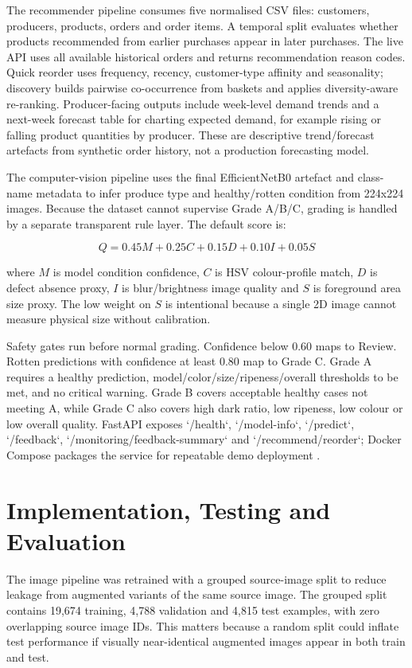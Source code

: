 \documentclass[11pt,a4paper]{article}
\begin{document}
The recommender pipeline consumes five normalised CSV files: customers, producers, products, orders and order items. A temporal split evaluates whether products recommended from earlier purchases appear in later purchases. The live API uses all available historical orders and returns recommendation reason codes. Quick reorder uses frequency, recency, customer-type affinity and seasonality; discovery builds pairwise co-occurrence from baskets and applies diversity-aware re-ranking. Producer-facing outputs include week-level demand trends and a next-week forecast table for charting expected demand, for example rising or falling product quantities by producer. These are descriptive trend/forecast artefacts from synthetic order history, not a production forecasting model.

The computer-vision pipeline uses the final EfficientNetB0 artefact and class-name metadata to infer produce type and healthy/rotten condition from 224x224 images. Because the dataset cannot supervise Grade A/B/C, grading is handled by a separate transparent rule layer. The default score is:

\[
Q = 0.45M + 0.25C + 0.15D + 0.10I + 0.05S
\]

where \(M\) is model condition confidence, \(C\) is HSV colour-profile match, \(D\) is defect absence proxy, \(I\) is blur/brightness image quality and \(S\) is foreground area size proxy. The low weight on \(S\) is intentional because a single 2D image cannot measure physical size without calibration.

Safety gates run before normal grading. Confidence below 0.60 maps to Review. Rotten predictions with confidence at least 0.80 map to Grade C. Grade A requires a healthy prediction, model/color/size/ripeness/overall thresholds to be met, and no critical warning. Grade B covers acceptable healthy cases not meeting A, while Grade C also covers high dark ratio, low ripeness, low colour or low overall quality. FastAPI exposes `/health`, `/model-info`, `/predict`, `/feedback`, `/monitoring/feedback-summary` and `/recommend/reorder`; Docker Compose packages the service for repeatable demo deployment \citep{dockercompose2026}.

\section{Implementation, Testing and Evaluation}
The image pipeline was retrained with a grouped source-image split to reduce leakage from augmented variants of the same source image. The grouped split contains 19,674 training, 4,788 validation and 4,815 test examples, with zero overlapping source image IDs. This matters because a random split could inflate test performance if visually near-identical augmented images appear in both train and test.
\end{document}
